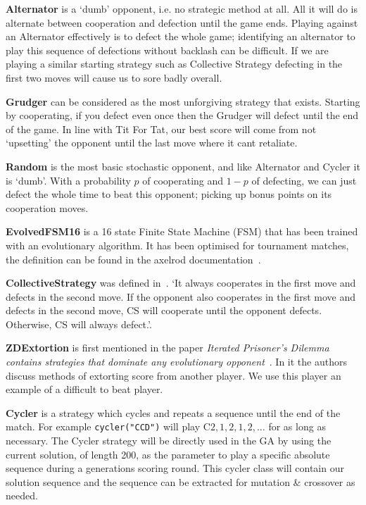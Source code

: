 \textbf{Alternator} is a `dumb' opponent, i.e. no strategic method at all. All it will do is alternate between cooperation and defection until the game ends. 
Playing against an Alternator effectively is to defect the whole game; identifying an alternator to play this sequence of defections without backlash can be difficult.
If we are playing a similar starting strategy such as Collective Strategy defecting in the first two moves will cause us to sore badly overall.

\textbf{Grudger} can be considered as the most unforgiving strategy that exists.
Starting by cooperating, if you defect even once then the Grudger will defect until the end of the game.
In line with Tit For Tat, our best score will come from not `upsetting' the opponent until the last move where it cant retaliate.

\textbf{Random} is the most basic stochastic opponent, and like Alternator and Cycler it is `dumb'. 
With a probability $p$ of cooperating and $1-p$ of defecting, we can just defect the whole time to beat this opponent; picking up bonus points on its cooperation moves.

\textbf{EvolvedFSM16} is a 16 state Finite State Machine (FSM) that has been trained with an evolutionary algorithm. It has been optimised for tournament matches, the definition can be found in the axelrod documentation~\cite{axelrodproject}.

\textbf{CollectiveStrategy} was defined in~\cite{li2009strategy}.
‘It always cooperates in the first move and defects in the second move.
If the opponent also cooperates in the first move and defects in the second move, CS will cooperate until the opponent defects. Otherwise, CS will always defect.’.

\textbf{ZDExtortion} is first mentioned in the paper \textit{Iterated Prisoner’s Dilemma contains strategies that dominate any evolutionary opponent}~\cite{press2012iterated}.
In it the authors discuss methods of extorting score from another player. We use this player an example of a difficult to beat player.

\textbf{Cycler} is a strategy which cycles and repeats a sequence until the end of the match. 
For example \texttt{cycler("CCD")} will play C$2,1,2,1,2,\ldots$ for as long as necessary.
The Cycler strategy will be directly used in the GA by using the current solution, of length 200, as the parameter to play a specific absolute sequence during a generations scoring round.
This cycler class will contain our solution sequence and the sequence can be extracted for mutation \& crossover as needed.


